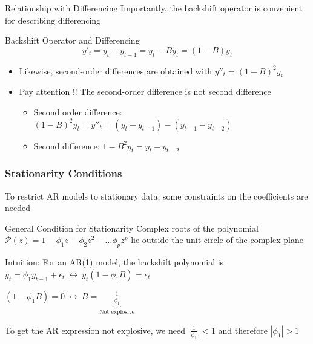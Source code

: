 \documentclass{beamer}
\newenvironment{wideitemize}{\itemize\addtolength{\itemsep}{10pt}}{\enditemize}
\begin{document}
\begin{frame}{Relationship with Differencing}
  Importantly, the backshift operator is convenient for describing differencing\\

  \medskip
  
  \begin{exampleblock}{Backshift Operator and Differencing}
    $$y'_t = y_t - y_{t-1} = y_t - By_t = (1-B)y_t$$
  \end{exampleblock}


  \begin{itemize}
    \item Likewise, second-order differences are obtained with $y''_t = (1-B)^2y_t$  
    \item Pay attention !! The second-order difference is not second difference 
      \begin{itemize}
      \item Second order difference: $(1-B)^2 y_t = y''_t = (y_t - y_{t-1}) - (y_{t-1} - y_{t-2})$
      \item Second difference: $1-B^2 y_t = y_t - y_{t-2}$
      \end{itemize}
  \end{itemize}
  
\end{frame}
\begin{frame}
  \frametitle{Stationarity Conditions}
  To restrict AR models to stationary data, some constraints on the coefficients are needed

  \begin{alertblock}{General Condition for Stationarity}
    Complex roots of the polynomial $\mathcal{P}(z) = 1 - \phi_1z - \phi_2 z^{2} - \dots \phi_p z^{p}$ lie outside the unit circle of the complex plane
  \end{alertblock}

  \begin{wideitemize}
  \item Intuition: For an AR(1) model, the backshift polynomial is $y_t = \phi_1 y_{t-1} + \epsilon_t \ \leftrightarrow \ y_t(1-\phi_1B) = \epsilon_t$
  \item $(1-\phi_1B) = 0 \ \leftrightarrow \ B= \underbrace{\frac{1}{\phi_1}}_{\text{Not explosive}}$
  \item To get the AR expression not explosive, we need $|\frac{1}{\phi_1}| < 1$ and therefore $|\phi_1| > 1$ 
  \end{wideitemize}


  \end{frame}
\end{document}
